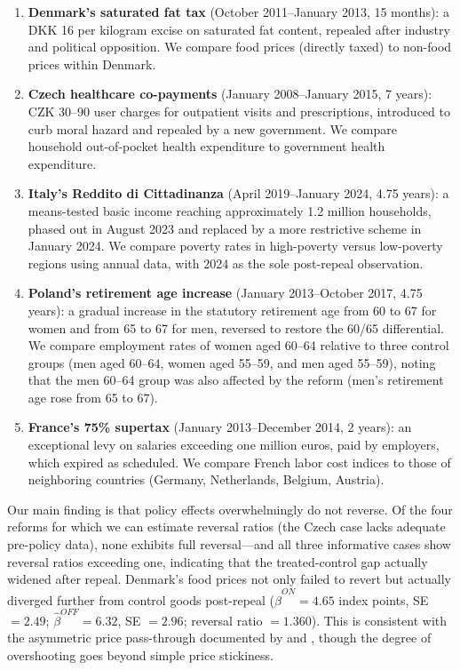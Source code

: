 \documentclass[12pt]{article}
\begin{document}
\begin{enumerate}
    \item \textbf{Denmark's saturated fat tax} (October 2011--January 2013, 15 months): a DKK 16 per kilogram excise on saturated fat content, repealed after industry and political opposition. We compare food prices (directly taxed) to non-food prices within Denmark.

    \item \textbf{Czech healthcare co-payments} (January 2008--January 2015, 7 years): CZK 30--90 user charges for outpatient visits and prescriptions, introduced to curb moral hazard and repealed by a new government. We compare household out-of-pocket health expenditure to government health expenditure.

    \item \textbf{Italy's Reddito di Cittadinanza} (April 2019--January 2024, 4.75 years): a means-tested basic income reaching approximately 1.2 million households, phased out in August 2023 and replaced by a more restrictive scheme in January 2024. We compare poverty rates in high-poverty versus low-poverty regions using annual data, with 2024 as the sole post-repeal observation.

    \item \textbf{Poland's retirement age increase} (January 2013--October 2017, 4.75 years): a gradual increase in the statutory retirement age from 60 to 67 for women and from 65 to 67 for men, reversed to restore the 60/65 differential. We compare employment rates of women aged 60--64 relative to three control groups (men aged 60--64, women aged 55--59, and men aged 55--59), noting that the men 60--64 group was also affected by the reform (men's retirement age rose from 65 to 67).

    \item \textbf{France's 75\% supertax} (January 2013--December 2014, 2 years): an exceptional levy on salaries exceeding one million euros, paid by employers, which expired as scheduled. We compare French labor cost indices to those of neighboring countries (Germany, Netherlands, Belgium, Austria).
\end{enumerate}

Our main finding is that policy effects overwhelmingly do not reverse. Of the four reforms for which we can estimate reversal ratios (the Czech case lacks adequate pre-policy data), none exhibits full reversal---and all three informative cases show reversal ratios exceeding one, indicating that the treated-control gap actually widened after repeal. Denmark's food prices not only failed to revert but actually diverged further from control goods post-repeal ($\hat{\beta}^{ON} = 4.65$ index points, SE $= 2.49$; $\hat{\beta}^{OFF} = 6.32$, SE $= 2.96$; reversal ratio $= 1.360$). This is consistent with the asymmetric price pass-through documented by \citet{peltzman2000prices} and \citet{benzarti2020really}, though the degree of overshooting goes beyond simple price stickiness.
\end{document}
